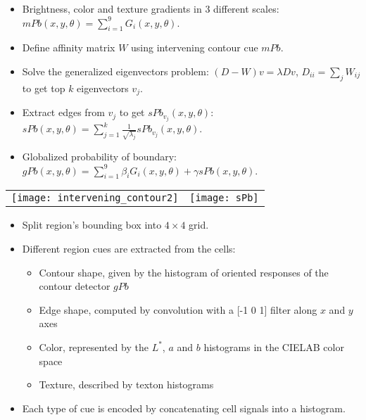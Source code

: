 \documentclass[11pt, a4paper, landscape]{article}
\begin{document}
\NewPage{}
\small
\vfill
\begin{itemize}
\item Brightness, color and texture gradients in 3 different scales: $mPb(x, y, \theta) = \sum\limits_{i = 1}^{9} G_i(x, y, \theta)$.
\item Define affinity matrix $W$ using intervening contour cue $mPb$.
\item Solve the generalized eigenvectors problem: $(D - W)v = \lambda D v$, $D_{ii} = \sum_j W_{ij}$\\ to get top $k$ eigenvectors $v_j$.
\item Extract edges from $v_j$ to get $sPb_{v_j}(x, y, \theta)$: $sPb(x, y, \theta) = \sum\limits_{j = 1}^{k} \frac{1}{\sqrt{\lambda_j}} sPb_{v_j} (x, y, \theta)$.
\item Globalized probability of boundary: $gPb(x, y, \theta) = \sum\limits_{i = 1}^{9} \beta_iG_i(x, y, \theta) + \gamma sPb(x, y, \theta)$.
\end{itemize}
\begin{table}
  \centering
  \begin{tabular}{@{} M{.3\linewidth} M{.7\linewidth} @{}}
      \texttt{[image: intervening\_contour2]}%
      &
      \texttt{[image: sPb]}%
  \end{tabular}
\end{table}
\vfill


\NewPage{}
\vfill
\begin{itemize}
\item Split region's bounding box into $4 \times 4$ grid.
\item Different region cues are extracted from the cells:
\begin{itemize}
\item Contour shape, given by the histogram of oriented responses of the contour detector $gPb$
\item Edge shape, computed by convolution with a [-1 0 1] filter along $x$ and $y$ axes
\item Color, represented by the $L^*$, $a$ and $b$ histograms in the CIELAB color space
\item Texture, described by texton histograms
\end{itemize}
\item Each type of cue is encoded by concatenating cell signals into a histogram.
\end{itemize}
\vfill
\end{document}
